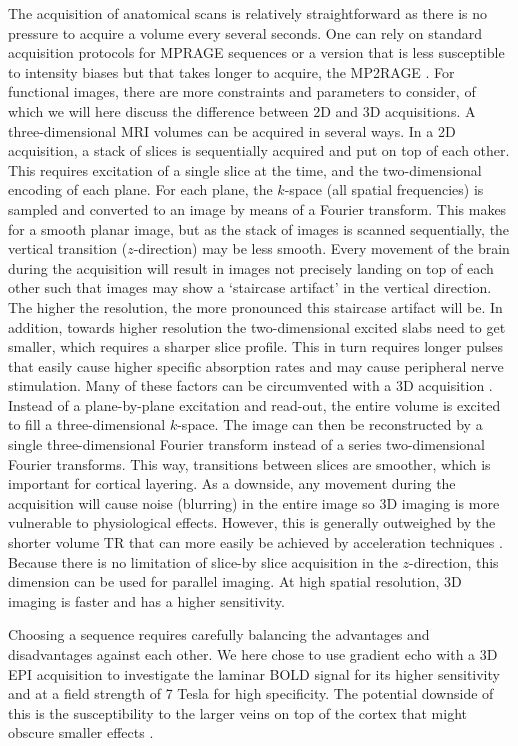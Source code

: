 The acquisition of anatomical scans is relatively straightforward as there is no pressure to acquire a volume every several seconds. One can rely on standard acquisition protocols for MPRAGE sequences \cite{Mugler1990} or a version that is less susceptible to intensity biases but that takes longer to acquire, the MP2RAGE \cite{Marques2010}. For functional images, there are more constraints and parameters to consider, of which we will here discuss the difference between 2D and 3D acquisitions. A three-dimensional MRI volumes can be acquired in several ways. In a 2D acquisition, a stack of slices is sequentially acquired and put on top of each other. This requires excitation of a single slice at the time, and the two-dimensional encoding of each plane. For each plane, the $k$-space (all spatial frequencies) is sampled and converted to an image by means of a Fourier transform. This makes for a smooth planar image, but as the stack of images is scanned sequentially, the vertical transition ($z$-direction) may be less smooth. Every movement of the brain during the acquisition will result in images not precisely landing on top of each other such that images may show a `staircase artifact' in the vertical direction. The higher the resolution, the more pronounced this staircase artifact will be. In addition, towards higher resolution the two-dimensional excited slabs need to get smaller, which requires a sharper slice profile. This in turn requires longer pulses that easily cause higher specific absorption rates and may cause peripheral nerve stimulation. Many of these factors can be circumvented with a 3D acquisition \cite{Poser2010}. Instead of a plane-by-plane excitation and read-out, the entire volume is excited \cite{Song1994} to fill a three-dimensional $k$-space. The image can then be reconstructed by a single three-dimensional Fourier transform instead of a series two-dimensional Fourier transforms. This way, transitions between slices are smoother, which is important for cortical layering. As a downside, any movement during the acquisition will cause noise (blurring) in the entire image so 3D imaging is more vulnerable to physiological effects. However, this is generally outweighed by the shorter volume TR that can more easily be achieved by acceleration techniques \cite{Poser2010}. Because there is no limitation of slice-by slice acquisition in the $z$-direction, this dimension can be used for parallel imaging. At high spatial resolution, 3D imaging is faster and has a higher sensitivity.

Choosing a sequence requires carefully balancing the advantages and disadvantages against each other. We here chose to use gradient echo with a 3D EPI acquisition to investigate the laminar BOLD signal for its higher sensitivity and at a field strength of 7 Tesla for high specificity. The potential downside of this is the susceptibility to the larger veins on top of the cortex that might obscure smaller effects \cite{Barth2007}.

